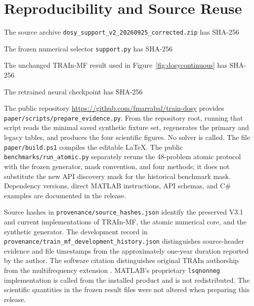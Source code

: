 \section{Reproducibility and Source Reuse}\label{app:repro}
The source archive \texttt{dosy\_support\_v2\_20260925\_corrected.zip} has SHA-256
\begin{quote}\small\ttfamily{}\end{quote}
The frozen numerical selector \texttt{support.py} has SHA-256
\begin{quote}\small\ttfamily{}\end{quote}
The unchanged TRAIn-MF result used in Figure~\ref{fig:dosycontinuous} has SHA-256
\begin{quote}\small\ttfamily{}\end{quote}
The retrained neural checkpoint has SHA-256
\begin{quote}\small\ttfamily{}\end{quote}

The public repository \url{https://github.com/fmarrabal/train-dosy} provides \texttt{paper/scripts/prepare\_evidence.py}. From the repository root, running that script reads the minimal saved synthetic fixture set, regenerates the primary and legacy tables, and produces the four scientific figures. No solver is called. The file \texttt{paper/build.ps1} compiles the editable LaTeX. The public \texttt{benchmarks/run\_atomic.py} separately reruns the 48-problem atomic protocol with the frozen generator, mask convention, and four methods; it does not substitute the new API discovery mask for the historical benchmark mask. Dependency versions, direct MATLAB instructions, API schemas, and C\# examples are documented in the release.

Source hashes in \texttt{provenance/source\_hashes.json} identify the preserved V3.1 and current implementations of TRAIn-MF, the atomic numerical core, and the synthetic generator. The development record in \texttt{provenance/train\_mf\_development\_history.json} distinguishes source-header evidence and file timestamps from the approximately one-year duration reported by the author. The software citation distinguishes original TRAIn authorship from the multifrequency extension \cite{train,mfv31,software}. MATLAB's proprietary \texttt{lsqnonneg} implementation is called from the installed product and is not redistributed. The scientific quantities in the frozen result files were not altered when preparing this release.

